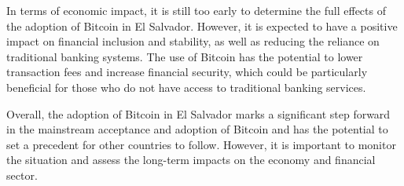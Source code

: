 In terms of economic impact, it is still too early to determine the full effects of the adoption of Bitcoin in El Salvador. However, it is expected to have a positive impact on financial inclusion and stability, as well as reducing the reliance on traditional banking systems. The use of Bitcoin has the potential to lower transaction fees and increase financial security, which could be particularly beneficial for those who do not have access to traditional banking services.\par
Overall, the adoption of Bitcoin in El Salvador marks a significant step forward in the mainstream acceptance and adoption of Bitcoin and has the potential to set a precedent for other countries to follow. However, it is important to monitor the situation and assess the long-term impacts on the economy and financial sector.


